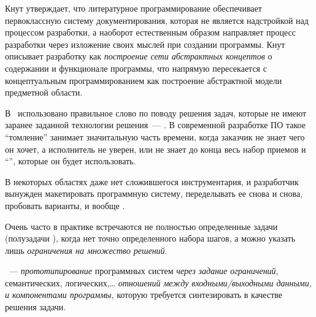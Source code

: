 \label{concept}\secdown

Кнут утверждает, что литературное программирование обеспечивает первоклассную
систему документирования, которая не является надстройкой над процессом
разработки, а наоборот естественным образом направляет процесс разработки через
изложение своих мыслей при создании программы. Кнут описывает разработку как
\emph{построение сети абстрактных концептов} о содержании и функционале
программы, что напрямую пересекается с концептуальным программированием
\cite{tyugu} как построение абстрактной модели предметной области.

В \cite{moskvitin1}\ использовано правильное слово по поводу решения задач,
которые не имеют заранее заданной технологии решения\ --- . В
современной разработке ПО такое ``томление'' занимает значитальную часть
времени, когда заказчик не знает чего он хочет, а исполнитель не уверен, или не
знает до конца весь набор приемов и ``'', которые он будет
использовать.

В некоторых областях даже нет сложившегося инструментария, и разработчик
вынужден макетировать программную систему, переделывать ее снова и снова,
пробовать варианты, и вообще .

Очень часто в практике встречаются не полностью определенные задачи (полузадачи
\cite{moskvitin1}), когда нет точно определенного набора шагов, а можно указать
лишь \emph{ограничения на множество решений}.

\begin{framed}\noindent
{}\ --- \emph{прототипирование} программных
систем \emph{через задание ограничений}, семантических, логических,\ldots
\emph{отношений между входными/выходными данными, и компонентами программы},
которую требуется синтезировать в качестве решения задачи.
\end{framed}

\secup
